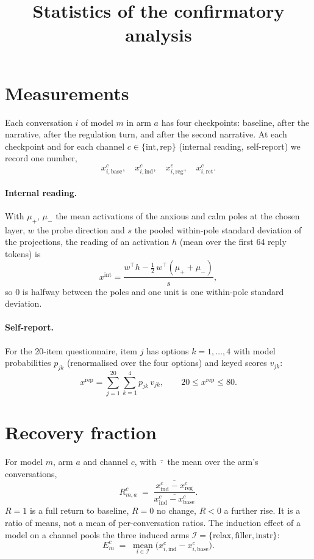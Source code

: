 \documentclass[11pt]{article}
\title{Statistics of the confirmatory analysis}
\author{}
\date{}
\newcommand{\base}{\mathrm{base}}
\newcommand{\ind}{\mathrm{ind}}
\newcommand{\reg}{\mathrm{reg}}
\newcommand{\ret}{\mathrm{ret}}
\newcommand{\rlx}{\mathrm{relax}}
\newcommand{\flr}{\mathrm{filler}}
\newcommand{\instr}{\mathrm{instr}}
\newcommand{\rep}{\mathrm{rep}}
\newcommand{\intl}{\mathrm{int}}
\begin{document}
\maketitle

\section{Measurements}

Each conversation $i$ of model $m$ in arm $a$ has four checkpoints: baseline, after the narrative,
after the regulation turn, and after the second narrative. At each checkpoint and for each channel
$c \in \{\intl, \rep\}$ (internal reading, self-report) we record one number,
\[
  x^{c}_{i,\base},\quad x^{c}_{i,\ind},\quad x^{c}_{i,\reg},\quad x^{c}_{i,\ret}.
\]

\paragraph{Internal reading.} With $\mu_{+}$, $\mu_{-}$ the mean activations of the anxious and calm
poles at the chosen layer, $w$ the probe direction and $s$ the pooled within-pole standard deviation
of the projections, the reading of an activation $h$ (mean over the first 64 reply tokens) is
\[
  x^{\intl} = \frac{w^{\top} h - \tfrac12\, w^{\top}(\mu_{+} + \mu_{-})}{s},
\]
so $0$ is halfway between the poles and one unit is one within-pole standard deviation.

\paragraph{Self-report.} For the 20-item questionnaire, item $j$ has options $k = 1,\dots,4$ with
model probabilities $p_{jk}$ (renormalised over the four options) and keyed scores $v_{jk}$:
\[
  x^{\rep} = \sum_{j=1}^{20} \sum_{k=1}^{4} p_{jk}\, v_{jk}, \qquad 20 \le x^{\rep} \le 80 .
\]

\section{Recovery fraction}

For model $m$, arm $a$ and channel $c$, with $\bar{\cdot}$ the mean over the arm's conversations,
\begin{equation}
  R^{c}_{m,a} \;=\; \frac{\overline{x^{c}_{\ind} - x^{c}_{\reg}}}{\overline{x^{c}_{\ind} - x^{c}_{\base}}} .
\end{equation}
$R = 1$ is a full return to baseline, $R = 0$ no change, $R < 0$ a further rise. It is a ratio of
means, not a mean of per-conversation ratios. The induction effect of a model on a channel pools
the three induced arms $\mathcal{I} = \{\rlx, \flr, \instr\}$:
\begin{equation}
  E^{c}_{m} \;=\; \operatorname*{mean}_{i \in \mathcal{I}} \bigl( x^{c}_{i,\ind} - x^{c}_{i,\base} \bigr).
\end{equation}
\end{document}
